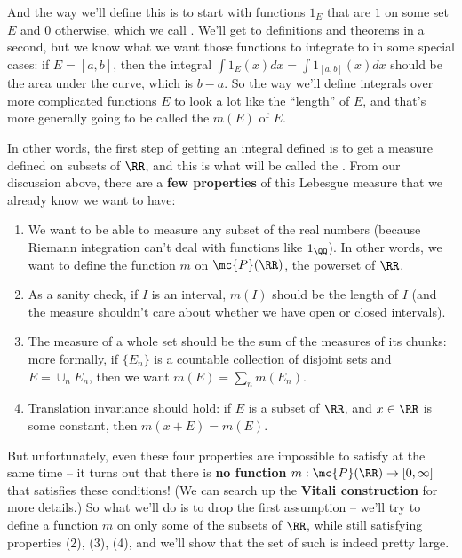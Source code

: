 And the way we'll define this is to start with functions $1_E$ that are $1$ on some set $E$ and $0$ otherwise, which we call . We'll get to definitions and theorems in a second, but we know what we want those functions to integrate to in some special cases: if $E = [a, b]$, then the integral $\int 1_E(x) dx = \int 1_{[a, b]}(x) dx$ should be the area under the curve, which is $b-a$. So the way we'll define integrals over more complicated functions $E$ to look a lot like the ``length'' of $E$, and that's more generally going to be called the  $m(E)$ of $E$. 

In other words, the first step of getting an integral defined is to get a measure defined on subsets of $\RR$, and this is what will be called the . From our discussion above, there are a \textbf{few properties} of this Lebesgue measure that we already know we want to have:

\begin{enumerate}
\item We want to be able to measure any subset of the real numbers (because Riemann integration can't deal with functions like $1_{\QQ}$). In other words, we want to define the function $m$ on $\mc{P}(\RR)$, the powerset of $\RR$.
\item As a sanity check, if $I$ is an interval, $m(I)$ should be the length of $I$ (and the measure shouldn't care about whether we have open or closed intervals). 
\item The measure of a whole set should be the sum of the measures of its chunks: more formally, if $\{E_n\}$ is a countable collection of disjoint sets and $E = \cup_n E_n$, then we want $m(E) = \sum_{n} m(E_n)$.
\item Translation invariance should hold: if $E$ is a subset of $\RR$, and $x \in \RR$ is some constant, then $m(x+E) = m(E)$.
\end{enumerate}

But unfortunately, even these four properties are impossible to satisfy at the same time -- it turns out that there is \textbf{no function} $m: \mc{P}(\RR) \to [0, \infty]$ that satisfies these conditions! (We can search up the \textbf{Vitali construction} for more details.) So what we'll do is to drop the first assumption -- we'll try to define a function $m$ on only some of the subsets of $\RR$, while still satisfying properties (2), (3), (4), and we'll show that the set of such  is indeed pretty large.

